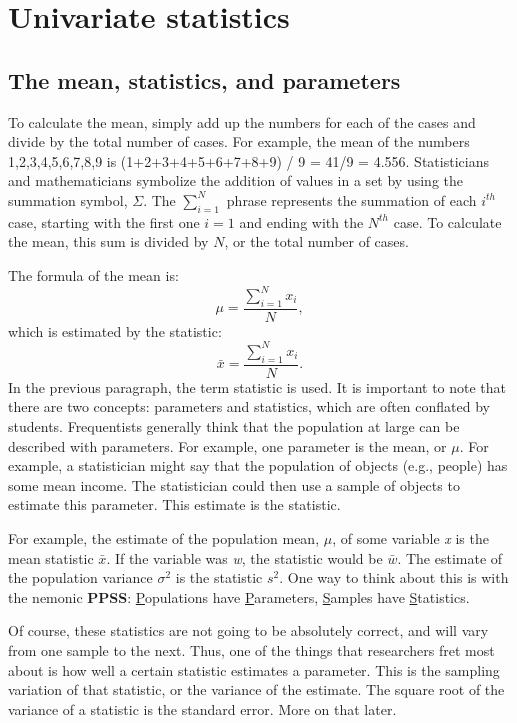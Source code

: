 
\chapter{Univariate statistics}

\section{The mean, statistics, and parameters}
To calculate the mean, simply add up the numbers for each of the cases and divide by the total number of cases. For example, the mean of the numbers 1,2,3,4,5,6,7,8,9 is (1+2+3+4+5+6+7+8+9) / 9 = 41/9 = 4.556. Statisticians and mathematicians symbolize the addition of values in a set by using the summation symbol, $\Sigma$. The $\sum_{i=1}^{N}$ phrase represents the summation of each $i^{th}$ case, starting with the first one $i = 1$ and ending with the $N^{th}$ case. To calculate the mean, this sum is divided by $N$, or the total number of cases.

The formula of the mean is:
\begin{equation}\label{eq:mean}
\mu=\frac{\sum_{i=1}^{N}x_i}{N},
\end{equation}
which is estimated by the statistic:
\begin{equation}
\bar{x}=\frac{\sum_{i=1}^{N}x_i}{N}.
\end{equation}
In the previous paragraph, the term statistic is used. It is important to note that there are two concepts: parameters and statistics, which are often conflated by students. Frequentists generally think that the population at large can be described with parameters. For example, one parameter is the mean, or $\mu$. For example, a statistician might say that the population of objects (e.g., people) has some mean income. The statistician could then use a sample of objects to estimate this parameter. This estimate is the statistic.

For example, the estimate of the population mean, $\mu$, of some variable {\it x} is the mean statistic $\bar{x}$. If the variable was {\it w}, the statistic would be $\bar{w}$. The estimate of the population variance $\sigma^2$ is the statistic $s^2$. One way to think about this is with the nemonic {\bf PPSS}: {\underline P}opulations have {\underline P}arameters, {\underline S}amples have {\underline S}tatistics.

Of course, these statistics are not going to be absolutely correct, and will vary from one sample to the next. Thus, one of the things that researchers fret most about is how well a certain statistic estimates a parameter. This is the sampling variation of that statistic, or the variance of the estimate. The square root of the variance of a statistic is the standard error. More on that later.
